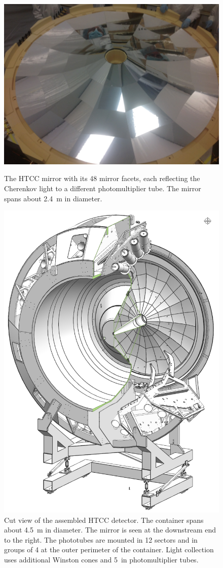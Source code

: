 \documentclass[final,3p,twocolumn]{elsarticle}
\begin{document}
\begin{figure}[htbp!]
\centerline{\includegraphics[angle=90,width=0.75\columnwidth]{HTCC-mirror.png}}
\caption{The HTCC mirror with its 48 mirror facets, each reflecting the Cherenkov light to a different photomultiplier
tube. The mirror spans about 2.4~m in diameter.}
\label{htcc}
\centerline{\includegraphics[width=0.9\columnwidth]{htcc-view-3.png}}
\caption{Cut view of the assembled HTCC detector. The container spans about 4.5~m in diameter. The mirror is
seen at the downstream end to the right. The phototubes are mounted in 12 sectors and in groups of 4 at the outer
perimeter of the container. Light collection uses additional Winston cones and 5~in photomultiplier tubes.}
\label{HTCC-container}
\end{figure}
\end{document}
